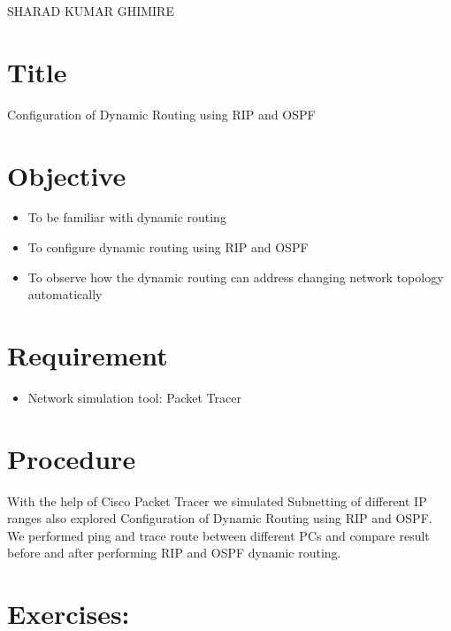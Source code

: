 \documentclass[a4paper,11pt]{article}
\begin{document}
{SHARAD KUMAR GHIMIRE}

\renewcommand{\contentsname}{Table of Contents}
\tableofcontents

\pagebreak
\lstlistoflistings
\pagebreak
\listoffigures
\pagebreak
{}

\section{Title} {\large Configuration of Dynamic Routing using RIP and OSPF}
\section{Objective}
\begin{itemize}
    \item To be familiar with dynamic routing
    \item To configure dynamic routing using RIP and OSPF
    \item To observe how the dynamic routing can address changing network topology automatically
\end{itemize}
\section{Requirement}
\begin{itemize}
    \item Network simulation tool: Packet Tracer
\end{itemize}

\section{Procedure}

With the help of Cisco Packet Tracer we simulated Subnetting of different IP ranges also explored
Configuration of Dynamic Routing using RIP and OSPF. We performed  ping and trace route between different PCs and compare result before and after performing RIP and OSPF dynamic routing.


\pagebreak
\section{Exercises:}
\end{document}
